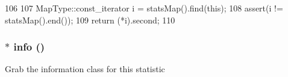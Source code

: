\begin{DoxyCode}
106 {
107     MapType::const_iterator i = statsMap().find(this);
108     assert(i != statsMap().end());
109     return (*i).second;
110 }
\end{DoxyCode}
\hypertarget{classStats_1_1InfoAccess_af42813244273f247e199283572cb5e9c}{
\subsubsection[{info}]{ $\ast$ info ()}}
\label{classStats_1_1InfoAccess_af42813244273f247e199283572cb5e9c}
Grab the information class for this statistic 

